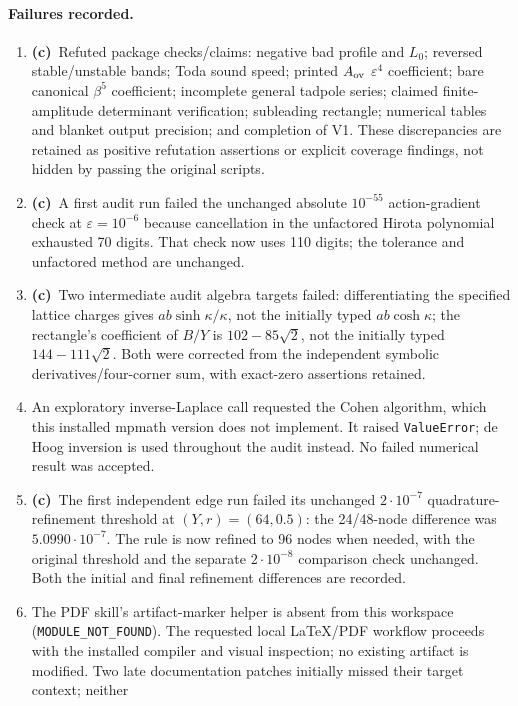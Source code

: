 \documentclass[11pt,a4paper]{article}
\newcommand{\Lc}{\textbf{(c)}\ }
\begin{document}
\clearpage
\paragraph{Failures recorded.}
\begin{enumerate}
\item \Lc Refuted package checks/claims: negative bad profile and $L_0$;
reversed stable/unstable bands; Toda sound speed; printed $A_{\rm ov}$
$\varepsilon^4$ coefficient; bare canonical $\beta^5$ coefficient;
incomplete general tadpole series; claimed finite-amplitude determinant
verification; subleading rectangle; numerical tables and blanket output
precision; and completion of V1. These discrepancies are retained as positive
refutation assertions or explicit coverage findings, not hidden by passing
the original scripts.
\item \Lc A first audit run failed the unchanged absolute $10^{-55}$
action-gradient check at $\varepsilon=10^{-6}$ because cancellation in the
unfactored Hirota polynomial exhausted 70 digits. That check now uses 110
digits; the tolerance and unfactored method are unchanged.
\item \Lc Two intermediate audit algebra targets failed: differentiating the
specified lattice charges gives $ab\sinh\kappa/\kappa$, not the initially
typed $ab\cosh\kappa$; the rectangle's coefficient of $B/Y$ is
$102-85\sqrt2$, not the initially typed $144-111\sqrt2$.
Both were corrected from the independent symbolic derivatives/four-corner
sum, with exact-zero assertions retained.
\item An exploratory inverse-Laplace call requested the Cohen algorithm,
which this installed mpmath version does not implement. It raised
\texttt{ValueError}; de Hoog inversion is used throughout the audit instead.
No failed numerical result was accepted.
\item \Lc The first independent edge run failed its unchanged
$2\cdot10^{-7}$ quadrature-refinement threshold at $(Y,r)=(64,0.5)$:
the 24/48-node difference was $5.0990\cdot10^{-7}$.
The rule is now refined to 96 nodes when needed, with the original threshold
and the separate $2\cdot10^{-8}$ comparison check unchanged. Both the
initial and final refinement differences are recorded.
\item The PDF skill's artifact-marker helper is absent from this workspace
(\texttt{MODULE\_NOT\_FOUND}). The requested local LaTeX/PDF workflow proceeds
with the installed compiler and visual inspection; no existing artifact is
modified.
Two late documentation patches initially missed their target context; neither

\end{enumerate}
\end{document}
